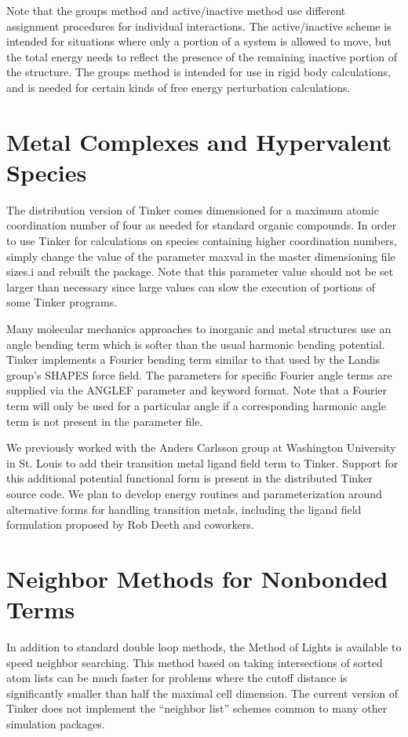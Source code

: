 \documentclass[letterpaper,11pt,english]{sphinxmanual}
\begin{document}
\sphinxAtStartPar
Note that the groups method and active/inactive method use different assignment procedures for individual interactions. The active/inactive scheme is intended for situations where only a portion of a system is allowed to move, but the total energy needs to reflect the presence of the remaining inactive portion of the structure. The groups method is intended for use in rigid body calculations, and is needed for certain kinds of free energy perturbation calculations.


\section{Metal Complexes and Hypervalent Species}
\label{\detokenize{text/special-features:metal-complexes-and-hypervalent-species}}
\sphinxAtStartPar
The distribution version of Tinker comes dimensioned for a maximum atomic coordination number of four as needed for standard organic compounds. In order to use Tinker for calculations on species containing higher coordination numbers, simply change the value of the parameter maxval in the master dimensioning file sizes.i and rebuilt the package. Note that this parameter value should not be set larger than necessary since large values can slow the execution of portions of some Tinker programs.

\sphinxAtStartPar
Many molecular mechanics approaches to inorganic and metal structures use an angle bending term which is softer than the usual harmonic bending potential. Tinker implements a Fourier bending term similar to that used by the Landis group’s SHAPES force field. The parameters for specific Fourier angle terms are supplied via the ANGLEF parameter and keyword format. Note that a Fourier term will only be used for a particular angle if a corresponding harmonic angle term is not present in the parameter file.

\sphinxAtStartPar
We previously worked with the Anders Carlsson group at Washington University in St. Louis to add their transition metal ligand field term to Tinker. Support for this additional potential functional form is present in the distributed Tinker source code. We plan to develop energy routines and parameterization around alternative forms for handling transition metals, including the ligand field formulation proposed by Rob Deeth and coworkers.


\section{Neighbor Methods for Nonbonded Terms}
\label{\detokenize{text/special-features:neighbor-methods-for-nonbonded-terms}}
\sphinxAtStartPar
In addition to standard double loop methods, the Method of Lights is available to speed neighbor searching. This method based on taking intersections of sorted atom lists can be much faster for problems where the cutoff distance is significantly smaller than half the maximal cell dimension. The current version of Tinker does not implement the “neighbor list” schemes common to many other simulation packages.
\end{document}
